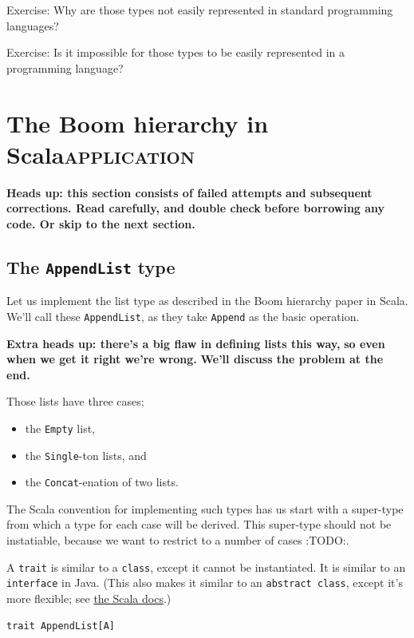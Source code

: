 \documentclass[11pt]{article}
\begin{document}
Exercise: Why are those types not easily represented in standard
programming languages?

Exercise: Is it impossible for those types to be easily represented
in a programming language?

\section{The Boom hierarchy in Scala\hfill{}\textsc{application}}
\label{sec:org8a88c76}
\begin{center}
\textbf{Heads up: this section consists of failed attempts}
\textbf{and subsequent corrections. Read carefully, and double check}
\textbf{before borrowing any code. Or skip to the next section.}
\end{center}

\subsection{The \texttt{AppendList} type}
\label{sec:org8c839c0}
Let us implement the list type as described in the Boom hierarchy paper
in Scala. We'll call these \texttt{AppendList}, as they take \texttt{Append} as
the basic operation.

\begin{center}
\textbf{Extra heads up: there's a big flaw in defining lists this way,}
\textbf{so even when we get it right we're wrong.}
\textbf{We'll discuss the problem at the end.}
\end{center}

Those lists have three cases;
\begin{itemize}
\item the \texttt{Empty} list,
\item the \texttt{Single}-ton lists, and
\item the \texttt{Concat}-enation of two lists.
\end{itemize}

The Scala convention for implementing such types
has us start with a super-type from which a type
for each case will be derived.
This super-type should not be instatiable,
because we want to restrict to a number of cases :TODO:.

A \texttt{trait} is similar to a \texttt{class}, except it cannot be instantiated.
It is similar to an \texttt{interface} in Java.
(This also makes it similar to an \texttt{abstract class},
except it's more flexible; see
\href{https://docs.scala-lang.org/overviews/scala-book/abstract-classes.html}{the Scala docs}.)
\begin{verbatim}
trait AppendList[A]
\end{verbatim}
\end{document}
